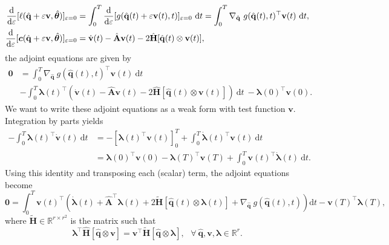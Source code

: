 \begin{align*}
    \dv{}{\varepsilon}[\mathcal{\ell}(\hat{\mathbf{q}}+\varepsilon \mathbf{v},\hat{\bm{\theta}})]_{\varepsilon=0} &= \int_0^T \dv{}{\varepsilon}[g(\hat{\mathbf{q}}(t)+\varepsilon \mathbf{v}(t),t)]_{\varepsilon=0}~\mathrm{d}t = \int_0^T \nabla_{\hat{\mathbf{q}}}~g(\hat{\mathbf{q}}(t),t)^{\top}\mathbf{v}(t)~\mathrm{d}t,\\
    \dv{}{\varepsilon}[\boldsymbol{c}(\hat{\mathbf{q}}+\varepsilon \mathbf{v},\hat{\bm{\theta}})]_{\varepsilon=0} &= \dot{\mathbf{v}}(t) - \hat{\mathbf{A}}\mathbf{v}(t) - 2\hat{\mathbf{H}}[\hat{\mathbf{q}}(t)\otimes \mathbf{v}(t)],
\end{align*}
the adjoint equations are given by\\
\begin{align*}
    \bm{0} &= \int_0^T \nabla_{\hat{\mathbf{q}}}~g(\hat{\mathbf{q}}(t),t)^{\top}\mathbf{v}(t)~\mathrm{d}t\\
    &- \int_0^T \bm{\lambda}(t)^{\top} \left( \dot{\mathbf{v}}(t) - \hat{\mathbf{A}}\mathbf{v}(t) - 2\hat{\mathbf{H}}[\hat{\mathbf{q}}(t)\otimes \mathbf{v}(t)] \right)~\mathrm{d}t~- \bm{\lambda}(0)^{\top}\mathbf{v}(0). 
\end{align*}
We want to write these adjoint equations as a weak form with test function $\mathbf{v}$. Integration by parts yields\\
\begin{align*}
    -\int_0^T\bm{\lambda}(t)^{\top} \dot{\mathbf{v}}(t)~\mathrm{d}t &= -\left[ \bm{\lambda}(t)^{\top} \mathbf{v}(t) \right]_0^T + \int_0^T \dot{\bm{\lambda}}(t)^{\top}\mathbf{v}(t)~\mathrm{d}t\\
    &= \bm{\lambda}(0)^{\top} \mathbf{v}(0) - \bm{\lambda}(T)^{\top} \mathbf{v}(T) + \int_0^T \mathbf{v}(t)^{\top}\dot{\bm{\lambda}}(t)~\mathrm{d}t.
\end{align*}
Using this identity and transposing each (scalar) term, the adjoint equations become\\
\begin{equation*}
    \bm{0} = \int_0^T \mathbf{v}(t)^{\top} \left( \dot{\bm{\lambda}}(t) + \hat{\mathbf{A}}^{\top} \bm{\lambda}(t) + 2\tilde{\mathbf{H}}[\hat{\mathbf{q}}(t)\otimes \bm{\lambda}(t)] + \nabla_{\hat{\mathbf{q}}}~g(\hat{\mathbf{q}}(t),t) \right)\mathrm{d}t - \mathbf{v}(T)^{\top}\bm{\lambda}(T), 
\end{equation*}
where $\tilde{\mathbf{H}}\in\mathbb{R}^{r\times r^2}$ is the matrix such that\\
$$\bm{\lambda}^{\top}\hat{\mathbf{H}}[\hat{\mathbf{q}}\otimes \mathbf{v}] = \mathbf{v}^{\top}\tilde{\mathbf{H}}[\hat{\mathbf{q}}\otimes \bm{\lambda}],~~~\forall~\hat{\mathbf{q}}, \mathbf{v}, \bm{\lambda} \in \mathbb{R}^r.$$
